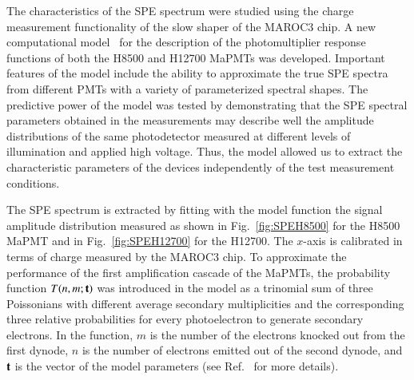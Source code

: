 \documentclass[5p,times,twocolumn]{elsarticle}
\begin{document}
The characteristics of the SPE spectrum were studied using the charge measurement functionality of the slow shaper
of the MAROC3 chip. A new computational model~\cite{Pavel} for the description of the photomultiplier response
functions of both the H8500 and H12700 MaPMTs was developed. Important features of the model include the ability
to approximate the true SPE spectra from different PMTs with a variety of
parameterized spectral shapes.
The predictive power of the model was tested by demonstrating that the SPE spectral parameters obtained in the
measurements may describe well the amplitude distributions of the same photodetector measured at different levels
of illumination and applied high voltage. Thus, the model allowed us to extract the characteristic parameters of the devices independently of the test measurement conditions.

The SPE spectrum is extracted by fitting with the model function the signal amplitude distribution measured 
as shown in Fig.~\ref{fig:SPEH8500} for the H8500 MaPMT and in Fig.~\ref{fig:SPEH12700} for the H12700.
The $x$-axis is calibrated in terms of charge measured by the MAROC3 chip.
To approximate the performance of the first amplification cascade of the MaPMTs, the probability function
$T(n,m;{\bf t})$ was introduced in the model as a trinomial sum of three Poissonians with different average secondary
multiplicities and the corresponding three relative probabilities for every photoelectron to generate secondary
electrons. In the function, $m$ is the number of the electrons knocked out from the first dynode, $n$ is the number
of electrons emitted out of the second dynode, and ${\bf t}$ is the vector of the model parameters
(see Ref.~\cite{Pavel} for more details).
\end{document}

